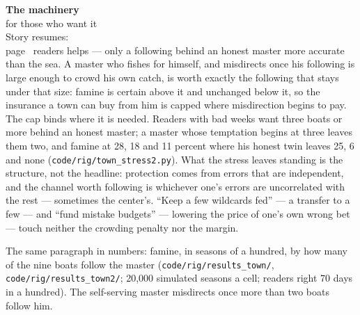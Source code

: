 \begin{machinery}{\textbf{The machinery}\\for those who want it\\[3pt]{\color{muted}Story resumes:\\page~\pageref{ch12}}}
readers helps --- only a following behind an honest master more accurate
than the sea. A master who fishes for himself, and misdirects once his
following is large enough to crowd his own catch, is worth exactly the
following that stays under that size: famine is certain above it and
unchanged below it, so the insurance a town can buy from him is capped
where misdirection begins to pay. The cap binds where it is needed.
Readers with bad weeks want three boats or more behind an honest
master; a master whose temptation begins at three leaves them two, and
famine at 28, 18 and 11 percent where his honest twin leaves 25, 6 and
none (\texttt{code/\allowbreak{}rig/\allowbreak{}town\_\allowbreak{}stress2.\allowbreak{}py}). What the stress leaves standing is the
structure, not the headline: protection comes from errors that are
independent, and the channel worth following is whichever one's
errors are uncorrelated with the rest --- sometimes the center's. ``Keep
a few wildcards fed'' --- a transfer
to a few --- and ``fund mistake budgets'' --- lowering the price of one's
own wrong bet --- touch neither the crowding penalty nor the margin.

\tableneed{118pt}

The same paragraph in numbers: famine, in seasons of a hundred, by how many of the nine boats follow the master (\texttt{code/\allowbreak{}rig/\allowbreak{}results\_\allowbreak{}town/\allowbreak{}}, \texttt{code/\allowbreak{}rig/\allowbreak{}results\_\allowbreak{}town2/\allowbreak{}}; 20,000 simulated seasons a cell; readers right 70 days in a hundred). The self-serving master misdirects once more than two boats follow him.


\end{machinery}
